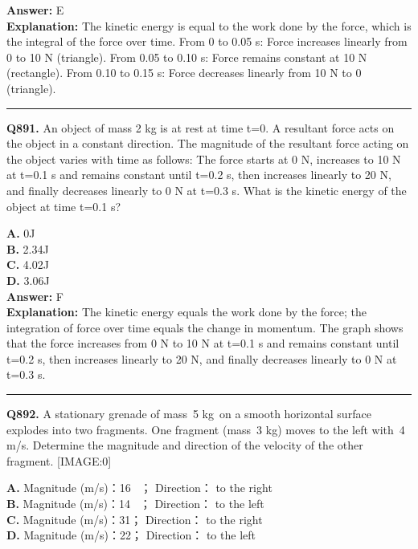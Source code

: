 \documentclass[12pt]{article}
\begin{document}
\textbf{Answer:} E \\
\textbf{Explanation:} The kinetic energy is equal to the work done by the force, which is the integral of the force over time.
From 0 to 0.05 s: Force increases linearly from 0 to 10 N (triangle).
From 0.05 to 0.10 s: Force remains constant at 10 N (rectangle).
From 0.10 to 0.15 s: Force decreases linearly from 10 N to 0 (triangle).

\hrule
\vspace{1em}


\noindent
\textbf{Q891.} An object of mass 2 kg is at rest at time t=0. A resultant force acts on the object in a constant direction. The magnitude of the resultant force acting on the object varies with time as follows:
The force starts at 0 N, increases to 10 N at t=0.1 s and remains constant until t=0.2 s, then increases linearly to 20 N, and finally decreases linearly to 0 N at t=0.3 s.
What is the kinetic energy of the object at time t=0.1 s?



\textbf{A.} 0J \\
\textbf{B.} 2.34J \\
\textbf{C.} 4.02J \\
\textbf{D.} 3.06J \\

\textbf{Answer:} F \\
\textbf{Explanation:} The kinetic energy equals the work done by the force; the integration of force over time equals the change in momentum. The graph shows that the force increases from 0 N to 10 N at t=0.1 s and remains constant until t=0.2 s, then increases linearly to 20 N, and finally decreases linearly to 0 N at t=0.3 s.

\hrule
\vspace{1em}


\noindent
\textbf{Q892.} A stationary grenade of mass 5
kg on a smooth horizontal surface explodes into two fragments. One fragment (mass 3
kg) moves to the left with 4
m/s. Determine the magnitude and direction of the velocity of the other fragment.
[IMAGE:0]



\textbf{A.} Magnitude (m/s)：16  ；
Direction：
to the right \\
\textbf{B.} Magnitude (m/s)：14  ；
Direction：
to the left \\
\textbf{C.} Magnitude (m/s)：31；
Direction：
to the right \\
\textbf{D.} Magnitude (m/s)：22；
Direction：
to the left \\
\end{document}
